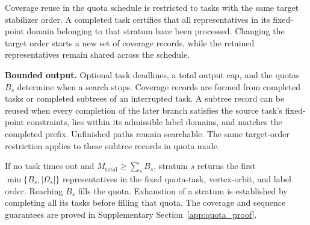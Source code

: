 Coverage reuse in the quota schedule is restricted to tasks with the same target stabilizer order. A completed task certifies that all representatives in its fixed-point domain belonging to that stratum have been processed. Changing the target order starts a new set of coverage records, while the retained representatives remain shared across the schedule.

\medskip
\noindent\textbf{Bounded output.}
Optional task deadlines, a total output cap, and the quotas $B_s$ determine when a search stops. Coverage records are formed from completed tasks or completed subtrees of an interrupted task. A subtree record can be reused when every completion of the later branch satisfies the source task's fixed-point constraints, lies within its admissible label domains, and matches the completed prefix. Unfinished paths remain searchable. The same target-order restriction applies to these subtree records in quota mode.

If no task times out and $M_{\mathrm{total}}\geq\sum_sB_s$, stratum $s$ returns the first $\min\{B_s,|\Omega_s|\}$ representatives in the fixed quota-task, vertex-orbit, and label order. Reaching $B_s$ fills the quota. Exhaustion of a stratum is established by completing all its tasks before filling that quota. The coverage and sequence guarantees are proved in Supplementary Section~\ref{app:quota_proof}.

